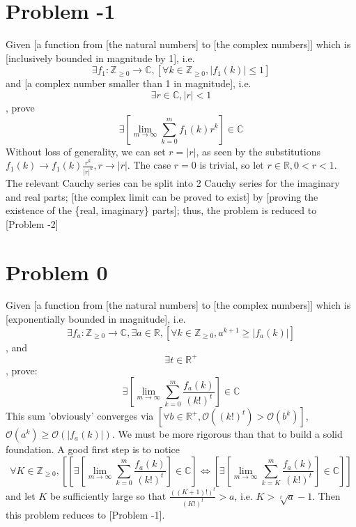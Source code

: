 \documentclass[]{article}
\newcommand{\pqty}[1]{{\left(#1\right)}}
\newcommand{\bqty}[1]{{\left[#1\right]}}
\newcommand{\abs}[1]{{\left\lvert#1\right\rvert}}
\numberwithin{equation}{section}
\begin{document}
	\section{Problem -1}
	Given [a function from [the natural numbers] to [the complex numbers]] which is [inclusively bounded in magnitude by 1], i.e.
	\begin{equation}
		\exists f_1:\mathbb{Z}_{\geq 0}\to\mathbb{C},
		\bqty{\forall k\in\mathbb{Z}_{\geq 0}, \abs{f_1\pqty{k}}\leq 1}
	\end{equation}
	and [a complex number smaller than 1 in magnitude], i.e.
	\begin{equation}
		\exists r\in\mathbb{C},
		\abs{r}<1
	\end{equation}
	, prove
	\begin{equation}
		\exists \bqty{\lim\limits_{m\to\infty}\sum_{k=0}^m{f_1\pqty{k}}r^k}
		\in\mathbb{C}
	\end{equation}
	Without loss of generality, we can set $r=\abs{r}$, as seen by the substitutions
	$f_1\pqty{k}\to f_1\pqty{k}\frac{r^k}{\abs{r}^k}, r\to\abs{r}$.
	The case $r=0$ is trivial, so let $r\in\mathbb{R},0<r<1$.
	The relevant Cauchy series can be split into 2 Cauchy series for the imaginary and real parts; [the complex limit can be proved to exist] by [proving the existence of the \{real, imaginary\} parts]; thus, the problem  is reduced to [Problem -2]
	
	\section{Problem 0}
	Given [a function from [the natural numbers] to [the complex numbers]] which is [exponentially bounded in magnitude], i.e.
	\begin{equation}
		\exists f_a:\mathbb{Z}_{\geq 0}\to\mathbb{C},
		\exists a\in\mathbb{R},
		\bqty{\forall k\in\mathbb{Z}_{\geq 0},
		a^{k+1}\geq\abs{f_a\pqty{k}}}
	\end{equation}
	, and
	\begin{equation}
		\exists t\in\mathbb{R}^+
	\end{equation}
	, prove:
	\begin{equation}
		\exists \bqty{\lim\limits_{m\to\infty}\sum_{k=0}^m\frac{f_a\pqty{k}}{\pqty{k!}^t}}
		\in\mathbb{C}
	\end{equation}
	This sum 'obviously' converges via $\bqty{\forall b\in\mathbb{R}^+,\mathcal{O}\pqty{\pqty{k!}^t}>\mathcal{O}\pqty{b^k}}$, $\mathcal{O}\pqty{a^k}\geq\mathcal{O}\pqty{\abs{f_a\pqty{k}}}$. We must be more rigorous than that to build a solid foundation.
	A good first step is to notice
	\begin{equation}
		\forall K\in\mathbb{Z}_{\geq 0},
		\bqty{\bqty{\exists \bqty{\lim\limits_{m\to\infty}\sum_{k=0}^m\frac{f_a\pqty{k}}{\pqty{k!}^t}}
		\in\mathbb{C}}
		\Leftrightarrow
		\bqty{\exists \bqty{\lim\limits_{m\to\infty}\sum_{k=K}^m\frac{f_a\pqty{k}}{\pqty{k!}^t}}
		\in\mathbb{C}}}
	\end{equation}
	and let $K$ be sufficiently large so that $\frac{\pqty{\pqty{K+1}!}^t}{\pqty{K!}^t}>a$, i.e. $K>\sqrt[t]{a}-1$. Then this problem reduces to [Problem -1].
\end{document}
